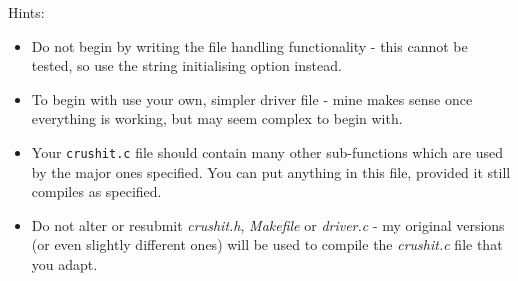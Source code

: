 \begin{exercise}
\noindent Hints:
\begin{itemize}
\item Do not begin by writing the file handling functionality -
this cannot be tested, so use the string initialising option
instead.
\item To begin with use your own, simpler driver file - mine
makes sense once everything is working, but may seem complex
to begin with.
\item Your \verb^crushit.c^ file should contain many other sub-functions
which are used by the major ones specified. You can put anything in this
file, provided it still compiles as specified.
\item Do not alter or resubmit {\em crushit.h}, {\em Makefile} or
{\em driver.c} - my original versions (or even slightly different
ones) will be used to compile the {\em crushit.c} file that you adapt.
\end{itemize}

\end{exercise}


